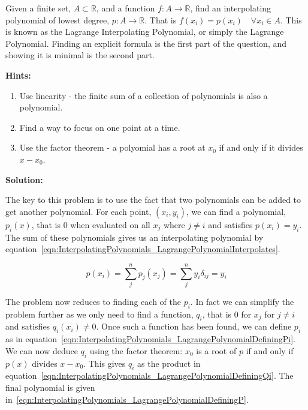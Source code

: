 Given a finite set, $A \subset \mathbb{R}$, and a function $f : A \to \mathbb{R}$, find an  interpolating polynomial of lowest degree, $p : A \to \mathbb{R}$. That is $f(x_i) = p(x_i) \quad \forall x_i \in A$. This is known as the Lagrange Interpolating Polynomial, or simply the Lagrange Polynomial. Finding an explicit formula is the first part of the question, and showing it is minimal is the second part.

\textbf{Hints:}

\begin{enumerate}
    \item Use linearity - the finite sum of a collection of polynomials is also a polynomial.
    \item Find a way to focus on one point at a time.
    \item Use the factor theorem - a polyomial has a root at $x_0$ if and only if it divides $x - x_0$.
\end{enumerate}

\textbf{Solution:}

The key to this problem is to use the fact that two polynomials can be added to get another polynomial. For each point, $(x_i, y_i)$, we can find a polynomial, $p_i(x)$, that is $0$ when evaluated on all $x_j$ where $j \ne i$ and satisfies $p(x_i) = y_i$. The sum of these polynomials gives us an interpolating polynomial by equation~\eqref{eqn:InterpolatingPolynomials_LagrangePolynomialInterpolates}.

\begin{equation}
	p(x_i) = \sum_j^n p_j(x_j) = \sum_j^n y_i \delta_{ij} = y_i
	\label{eqn:InterpolatingPolynomials_LagrangePolynomialInterpolates}
\end{equation}

The problem now reduces to finding each of the $p_i$. In fact we can simplify the problem further as we only need to find a function, $q_i$, that is $0$ for $x_j$ for $j \ne i$ and satisfies $q_i(x_i) \ne 0$. Once such a function has been found, we can define $p_i$ as in equation~\eqref{eqn:InterpolatingPolynomials_LagrangePolynomialDefiningPi}. We can now deduce $q_i$ using the factor theorem: $x_0$ is a root of $p$ if and only if $p(x)$ divides $x - x_0$. This gives $q_i$ as the product in equation~\eqref{eqn:InterpolatingPolynomials_LagrangePolynomialDefiningQi}. The final polynomial is given in~\eqref{eqn:InterpolatingPolynomials_LagrangePolynomialDefiningP}.

